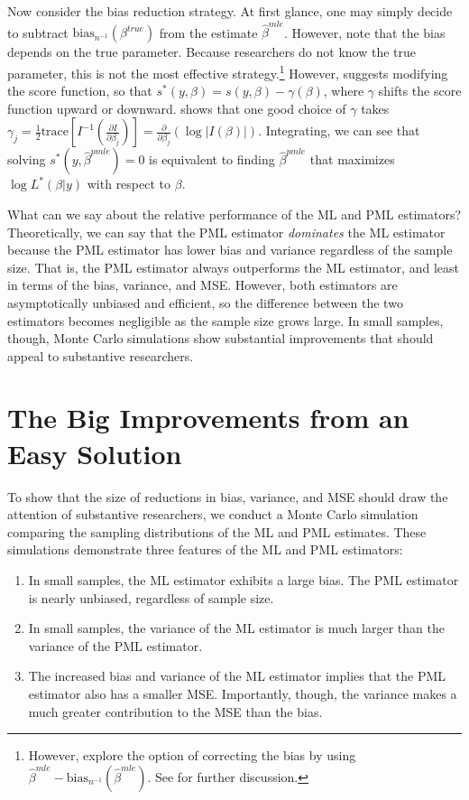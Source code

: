 \documentclass[12pt]{article}
\begin{document}
Now consider the bias reduction strategy. 
At first glance, one may simply decide to subtract $\text{bias}_{n^{-1}}(\beta^{true})$ from the estimate $\hat{\beta}^{mle}$. 
However, note that the bias depends on the true parameter. 
Because researchers do not know the true parameter, this is not the most effective strategy.\footnote{However, \cite{AndersonRichardson1979} explore the option of correcting the bias by using  $\hat{\beta}^{mle} - \text{bias}_{n^{-1}}(\hat{\beta}^{mle})$. See \citet[esp. p. 190]{Kosmidis2014} for further discussion.}
However, \cite{Firth1993} suggests modifying the score function, so that $s^*(y, \beta) = s(y, \beta) - \gamma(\beta)$, where $\gamma$ shifts the score function upward or downward.
\cite{Firth1993} shows that one good choice of $\gamma$ takes $\gamma_j = \frac{1}{2} \text{trace} \left[ I^{-1} \left( \frac{\partial I}{\partial \beta_j}\right)\right] = \frac{\partial}{\partial \beta_j} \left( \log | I(\beta) | \right)$.
Integrating, we can see that solving $s^*(y, \hat{\beta}^{pmle}) = 0$ is equivalent to finding $\hat{\beta}^{pmle}$ that maximizes $\log L^*(\beta | y)$ with respect to $\beta$.

What can we say about the relative performance of the ML and PML estimators? 
Theoretically, we can say that the PML estimator \textit{dominates} the ML estimator because the PML estimator has lower bias and variance regardless of the sample size. That is, the PML estimator always outperforms the ML estimator, and least in terms of the bias, variance, and MSE.
However, both estimators are asymptotically unbiased and efficient, so the difference between the two estimators becomes negligible as the sample size grows large.
In small samples, though, Monte Carlo simulations show substantial improvements that should appeal to substantive researchers.

\section*{The Big Improvements from an Easy Solution}

To show that the size of reductions in bias, variance, and MSE should draw the attention of substantive researchers, we conduct a Monte Carlo simulation comparing the sampling distributions of the ML and PML estimates.
These simulations demonstrate three features of the ML and PML estimators:
\begin{enumerate}
\item In small samples, the ML estimator exhibits a large bias. The PML estimator is nearly unbiased, regardless of sample size.
\item In small samples, the variance of the ML estimator is much larger than the variance of the PML estimator.
\item The increased bias and variance of the ML estimator implies that the PML estimator also has a smaller MSE. Importantly, though, the variance makes a much greater contribution to the MSE than the bias.
\end{enumerate}
\end{document}
